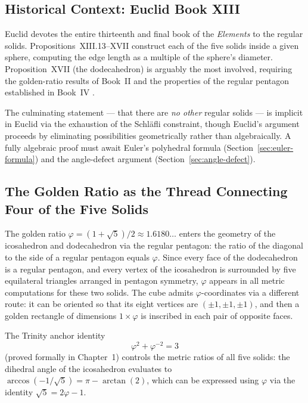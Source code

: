 \subsection{Historical Context: Euclid Book XIII}
\label{subsec:euclid-xiii}

Euclid devotes the entire thirteenth and final book of the \emph{Elements} to
the regular solids.  Propositions~XIII.13–XVII construct each of the five
solids inside a given sphere, computing the edge length as a multiple of the
sphere's diameter.  Proposition~XVII (the dodecahedron) is arguably the most
involved, requiring the golden-ratio results of Book~II and the properties of
the regular pentagon established in Book~IV \cite{euclid_elements}.

The culminating statement — that there are \emph{no other} regular solids — is
implicit in Euclid via the exhaustion of the Schläfli constraint, though
Euclid's argument proceeds by eliminating possibilities geometrically rather
than algebraically.  A fully algebraic proof must await Euler's polyhedral
formula (Section~\ref{sec:euler-formula}) and the angle-defect argument
(Section~\ref{sec:angle-defect}).

\subsection{The Golden Ratio as the Thread Connecting Four of the Five Solids}
\label{subsec:phi-thread}

The golden ratio $\varphi = (1+\sqrt{5})/2 \approx 1.6180\ldots$ enters the
geometry of the icosahedron and dodecahedron via the regular pentagon: the
ratio of the diagonal to the side of a regular pentagon equals $\varphi$.
Since every face of the dodecahedron is a regular pentagon, and every vertex of
the icosahedron is surrounded by five equilateral triangles arranged in
pentagon symmetry, $\varphi$ appears in all metric computations for these two
solids.  The cube admits $\varphi$-coordinates via a different route: it can be
oriented so that its eight vertices are $(\pm 1,\pm 1,\pm 1)$, and then a
golden rectangle of dimensions $1 \times \varphi$ is inscribed in each pair of
opposite faces.

The Trinity anchor identity
\begin{equation}
  \varphi^2 + \varphi^{-2} = 3
  \label{eq:trinity-anchor}
\end{equation}
(proved formally in Chapter~1) controls the metric ratios of all five solids:
the dihedral angle of the icosahedron evaluates to
$\arccos(-1/\sqrt{5}) = \pi - \arctan(2)$, which can be expressed using
$\varphi$ via the identity $\sqrt{5} = 2\varphi - 1$.


